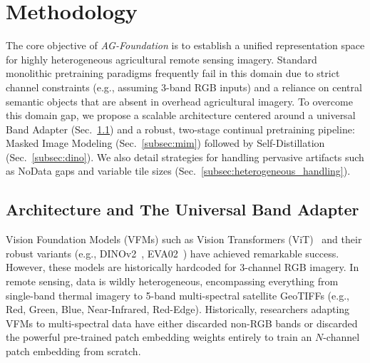\section{Methodology}
\label{sec:methodology}

The core objective of \textit{AG-Foundation} is to establish a unified representation space for highly heterogeneous agricultural remote sensing imagery. 
Standard monolithic pretraining paradigms frequently fail in this domain due to strict channel constraints (e.g., assuming 3-band RGB inputs) and a reliance on central semantic objects that are absent in overhead agricultural imagery.
To overcome this domain gap, we propose a scalable architecture centered around a universal Band Adapter (Sec.~\ref{subsec:band_adapter}) and a robust, two-stage continual pretraining pipeline: Masked Image Modeling (Sec.~\ref{subsec:mim}) followed by Self-Distillation (Sec.~\ref{subsec:dino}). We also detail strategies for handling pervasive artifacts such as NoData gaps and variable tile sizes (Sec.~\ref{subsec:heterogeneous_handling}).

\subsection{Architecture and The Universal Band Adapter}
\label{subsec:band_adapter}

Vision Foundation Models (VFMs) such as Vision Transformers (ViT)~\cite{dosovitskiy2020image} and their robust variants (e.g., DINOv2~\cite{oquab2023dinov2}, EVA02~\cite{fang2023eva}) have achieved remarkable success. However, these models are historically hardcoded for 3-channel RGB imagery. In remote sensing, data is wildly heterogeneous, encompassing everything from single-band thermal imagery to 5-band multi-spectral satellite GeoTIFFs (e.g., Red, Green, Blue, Near-Infrared, Red-Edge). 
Historically, researchers adapting VFMs to multi-spectral data have either discarded non-RGB bands or discarded the powerful pre-trained patch embedding weights entirely to train an $N$-channel patch embedding from scratch.

